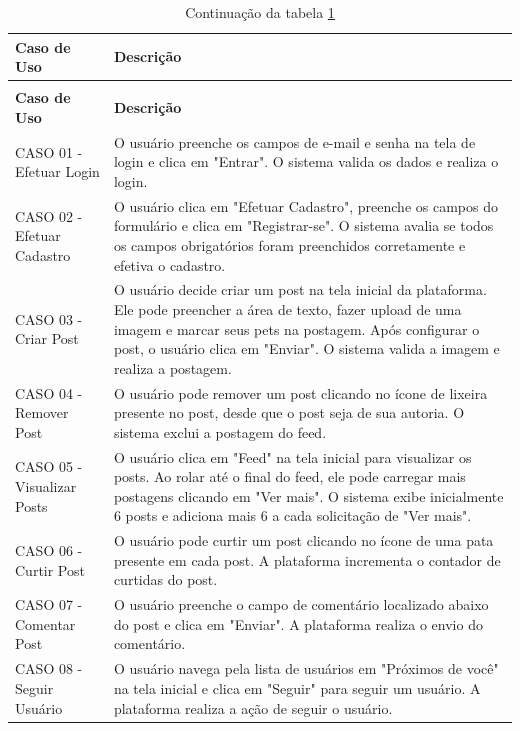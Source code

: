 \begin{longtable}{|p{4cm}|p{9cm}|}
\caption{Resumo dos fluxos básicos do MeuPetAqui.}
\label{tab:tabela6.2} \\
\hline
\textbf{Caso de Uso} & \textbf{Descrição} \\
\hline
\endfirsthead

\caption*{\small Continuação da tabela \ref{tab:tabela6.2}} \\
\hline
\textbf{Caso de Uso} & \textbf{Descrição} \\
\hline
\endhead
    \hline
    CASO 01 - Efetuar Login & O usuário preenche os campos de e-mail e senha na tela de login e clica em "Entrar". O sistema valida os dados e realiza o login. \\
    \hline
    CASO 02 - Efetuar Cadastro & O usuário clica em "Efetuar Cadastro", preenche os campos do formulário e clica em "Registrar-se". O sistema avalia se todos os campos obrigatórios foram preenchidos corretamente e efetiva o cadastro.\\
    \hline
    CASO 03 - Criar Post & O usuário decide criar um post na tela inicial da plataforma. Ele pode preencher a área de texto, fazer upload de uma imagem e marcar seus pets na postagem. Após configurar o post, o usuário clica em "Enviar". O sistema valida a imagem e realiza a postagem.\\
    \hline
    CASO 04 - Remover Post & O usuário pode remover um post clicando no ícone de lixeira presente no post, desde que o post seja de sua autoria. O sistema exclui a postagem do feed.\\
    \hline
    CASO 05 - Visualizar Posts & O usuário clica em "Feed" na tela inicial para visualizar os posts. Ao rolar até o final do feed, ele pode carregar mais postagens clicando em "Ver mais". O sistema exibe inicialmente 6 posts e adiciona mais 6 a cada solicitação de "Ver mais".\\
    \hline
    CASO 06 - Curtir Post & O usuário pode curtir um post clicando no ícone de uma pata presente em cada post. A plataforma incrementa o contador de curtidas do post.\\
    \hline
    CASO 07 - Comentar Post & O usuário preenche o campo de comentário localizado abaixo do post e clica em "Enviar". A plataforma realiza o envio do comentário.\\
    \hline
    CASO 08 - Seguir Usuário & O usuário navega pela lista de usuários em "Próximos de você" na tela inicial e clica em "Seguir" para seguir um usuário. A plataforma realiza a ação de seguir o usuário.\\

\end{longtable}
